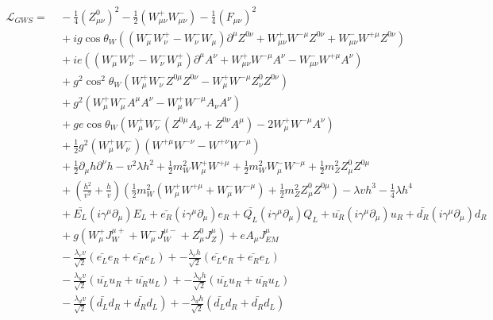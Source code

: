 \begin{equation}\label{eq:ewk_lagrangian_broken}
\begin{aligned}
\mathcal{L}_{GWS} = &~ -\frac{1}{4}(Z_{\mu\nu}^{0})^{2} -
\frac{1}{2}(W_{\mu\nu}^{+}W_{\mu\nu}^{-}) -
\frac{1}{4}(F_{\mu\nu})^{2}  \\
&~ + ig\cos{\theta_{W}}\left( (W_{\mu}^{-}W_{\nu}^{+} -
  W_{\nu}^{-}W_{\mu})\partial^{\mu}Z^{0\nu} +
  W_{\mu\nu}^{+}W^{-\mu}Z^{0\nu} + W_{\mu\nu}^{-}W^{+\mu}Z^{0\nu}
\right) \\ 
&~ + ie\left(
  (W_{\mu}^{-}W_{\nu}^{+}-W_{\nu}^{-}W_{\mu}^{+})\partial^{\mu}A^{\nu}
  + W_{\mu\nu}^{+}W^{-\mu}A^{\nu} - W_{\mu\nu}^{-}W^{+\mu}A^{\nu}
\right)\\
&~ + g^{2}\cos^{2}{\theta_{W}}\left(
  W_{\mu}^{+}W_{\nu}^{-}Z^{0\mu}Z^{0\nu} -
  W_{\mu}^{+}W^{-\mu}Z_{\nu}^{0}Z^{0\nu} \right) \\
&~ + g^{2}\left( W_{\mu}^{+}W_{\mu}^{-}A^{\mu}A^{\nu} -
  W_{\mu}^{+}W^{-\mu}A_{\nu}A^{\nu} \right) \\
&~ + ge\cos{\theta_{W}}\left( W_{\mu}^{+}W_{\nu}^{-}(Z^{0\mu}A_{\nu} +
  Z^{0\nu}A^{\mu}) - 2W_{\mu}^{+}W^{-\mu}A^{\nu} \right) \\
&~ + \frac{1}{2}g^{2}(W_{\mu}^{+}W_{\nu}^{-})(W^{+\mu}W^{-\nu} -
W^{+\nu}W^{-\mu}) \\
&~ + \frac{1}{2}\partial_{\mu}h\partial^{\nu}h - v^{2}{\lambda}h^{2} +
\frac{1}{2}m_{W}^{2}W_{\mu}^{+}W^{+\mu} +
\frac{1}{2}m_{W}^{2}W_{\mu}^{-}W^{-\mu} +
\frac{1}{2}m_{Z}^{2}Z_{\mu}^{0}Z^{0\mu} \\
&~ + (\frac{h^{2}}{v^{2}} + \frac{h}{v})\left(
  \frac{1}{2}m_{W}^{2}(W_{\mu}^{+}W^{+\mu} + W_{\mu}^{-}W^{-\mu}) +
  \frac{1}{2}m_{Z}^{2}Z_{\mu}^{0}Z^{0\mu} \right) - {\lambda}vh^{3} - \frac{1}{4}{\lambda}h^{4} \\
&~ + \bar{E_{L}}(i\gamma^{\mu}\partial_{\mu})E_{L} +
\bar{e_{R}}(i\gamma^{\mu}\partial_{\mu})e_{R} +
\bar{Q_{L}}(i\gamma^{\mu}\partial_{\mu})Q_{L} +
\bar{u_{R}}(i\gamma^{\mu}\partial_{\mu})u_{R}  +
\bar{d_{R}}(i\gamma^{\mu}\partial_{\mu})d_{R} \\ 
&~ + g(W_{\mu}^{+}J_{W}^{\mu+} + W_{\mu}^{-}J_{W}^{\mu-} +
Z_{\mu}^{0}J_{Z}^{\mu}) + eA_{\mu}J_{EM}^{\mu} \\
&~ -\frac{\lambda_{e}v}{\sqrt{2}}(\bar{e_{L}}e_{R}+\bar{e_{R}}e_{L}) +
-\frac{\lambda_{e}h}{\sqrt{2}}(\bar{e_{L}}e_{R}+\bar{e_{R}}e_{L}) \\
&~ -\frac{\lambda_{u}v}{\sqrt{2}}(\bar{u_{L}}u_{R}+\bar{u_{R}}u_{L}) +
-\frac{\lambda_{u}h}{\sqrt{2}}(\bar{u_{L}}u_{R}+\bar{u_{R}}u_{L})  \\
&~ -\frac{\lambda_{d}v}{\sqrt{2}}(\bar{d_{L}}d_{R}+\bar{d_{R}}d_{L}) +
-\frac{\lambda_{d}h}{\sqrt{2}}(\bar{d_{L}}d_{R}+\bar{d_{R}}d_{L})  \\
\end{aligned}
\end{equation}

